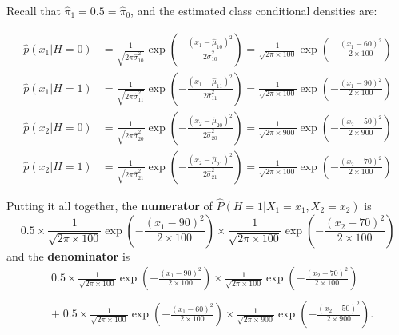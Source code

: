 \documentclass[12pt, answers]{exam}
\def\({\left(}
\def\){\right)}
\begin{document}
\begin{questions}
\begin{parts}
\begin{solution}
\bigskip

Recall that $\widehat{\pi}_1=0.5=\widehat{\pi}_0$, and the estimated class conditional densities are:

\bigskip
\begin{align*}
\widehat{p}(x_1|H=0)&= \frac{1}{\sqrt{2\pi\widehat{\sigma}^2_{10}}}\exp\left(-\frac{\(x_1-\widehat{\mu}_{10}\)^2}{2\widehat{\sigma}^2_{10}}\right)
=\frac{1}{\sqrt{2\pi\times100}}\exp\left(-\frac{\(x_1-60\)^2}{2\times100}\right)
\end{align*}
\begin{align*}
\widehat{p}(x_1|H=1)&= \frac{1}{\sqrt{2\pi\widehat{\sigma}^2_{11}}}\exp\left(-\frac{\(x_1-\widehat{\mu}_{11}\)^2}{2\widehat{\sigma}^2_{11}}\right)
=\frac{1}{\sqrt{2\pi\times100}}\exp\left(-\frac{\(x_1-90\)^2}{2\times100}\right)
\end{align*}
\begin{align*}
\widehat{p}(x_2|H=0)&= \frac{1}{\sqrt{2\pi\widehat{\sigma}^2_{20}}}\exp\left(-\frac{\(x_2-\widehat{\mu}_{20}\)^2}{2\widehat{\sigma}^2_{20}}\right)
=\frac{1}{\sqrt{2\pi\times900}}\exp\left(-\frac{\(x_2-50\)^2}{2\times900}\right)
\end{align*}
\begin{align*}
\widehat{p}(x_2|H=1)&= \frac{1}{\sqrt{2\pi\widehat{\sigma}^2_{21}}}\exp\left(-\frac{\(x_2-\widehat{\mu}_{21}\)^2}{2\widehat{\sigma}^2_{21}}\right)
=\frac{1}{\sqrt{2\pi\times100}}\exp\left(-\frac{\(x_2-70\)^2}{2\times100}\right)
\end{align*}

\medskip

Putting it all together, the \textbf{numerator} of $\widehat{P}(H=1|X_1=x_1, X_2=x_2)$ is
\begin{equation*}
{0.5\times \frac{1}{\sqrt{2\pi\times100}}\exp\left(-\frac{\(x_1-90\)^2}{2\times100}\right) \times \frac{1}{\sqrt{2\pi\times100}}\exp\left(-\frac{\(x_2-70\)^2}{2\times100}\right)}
\end{equation*}
and the \textbf{denominator} is
\begin{align*}
&0.5\times \frac{1}{\sqrt{2\pi\times100}}\exp\left(-\frac{\(x_1-90\)^2}{2\times100}\right) \times \frac{1}{\sqrt{2\pi\times100}}\exp\left(-\frac{\(x_2-70\)^2}{2\times100}\right)\\
\\
&+\;0.5\times \frac{1}{\sqrt{2\pi\times100}}\exp\left(-\frac{\(x_1-60\)^2}{2\times100}\right) \times \frac{1}{\sqrt{2\pi\times900}}\exp\left(-\frac{\(x_2-50\)^2}{2\times900}\right).
\end{align*}


\end{solution}
\end{parts}
\end{questions}
\end{document}
